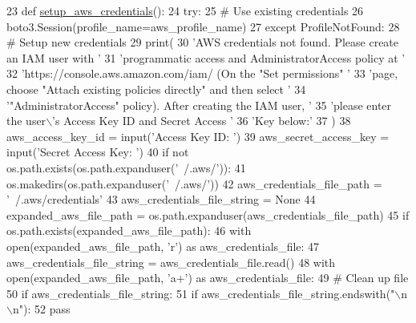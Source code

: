 \begin{DoxyCode}
23 \textcolor{keyword}{def }\hyperlink{namespaceparlai_1_1mturk_1_1core_1_1mturk__utils_a018a49fdf2cf6ff4c0b279d2f5b1bff0}{setup\_aws\_credentials}():
24     \textcolor{keywordflow}{try}:
25         \textcolor{comment}{# Use existing credentials}
26         boto3.Session(profile\_name=aws\_profile\_name)
27     \textcolor{keywordflow}{except} ProfileNotFound:
28         \textcolor{comment}{# Setup new credentials}
29         print(
30             \textcolor{stringliteral}{'AWS credentials not found. Please create an IAM user with '}
31             \textcolor{stringliteral}{'programmatic access and AdministratorAccess policy at '}
32             \textcolor{stringliteral}{'https://console.aws.amazon.com/iam/ (On the "Set permissions" '}
33             \textcolor{stringliteral}{'page, choose "Attach existing policies directly" and then select '}
34             \textcolor{stringliteral}{'"AdministratorAccess" policy). After creating the IAM user, '}
35             \textcolor{stringliteral}{'please enter the user\(\backslash\)'s Access Key ID and Secret Access '}
36             \textcolor{stringliteral}{'Key below:'}
37         )
38         aws\_access\_key\_id = input(\textcolor{stringliteral}{'Access Key ID: '})
39         aws\_secret\_access\_key = input(\textcolor{stringliteral}{'Secret Access Key: '})
40         \textcolor{keywordflow}{if} \textcolor{keywordflow}{not} os.path.exists(os.path.expanduser(\textcolor{stringliteral}{'~/.aws/'})):
41             os.makedirs(os.path.expanduser(\textcolor{stringliteral}{'~/.aws/'}))
42         aws\_credentials\_file\_path = \textcolor{stringliteral}{'~/.aws/credentials'}
43         aws\_credentials\_file\_string = \textcolor{keywordtype}{None}
44         expanded\_aws\_file\_path = os.path.expanduser(aws\_credentials\_file\_path)
45         \textcolor{keywordflow}{if} os.path.exists(expanded\_aws\_file\_path):
46             with open(expanded\_aws\_file\_path, \textcolor{stringliteral}{'r') as aws\_credentials\_file:}
47 \textcolor{stringliteral}{                aws\_credentials\_file\_string = aws\_credentials\_file.read()}
48 \textcolor{stringliteral}{        with open(expanded\_aws\_file\_path, 'a+'}) \textcolor{keyword}{as} aws\_credentials\_file:
49             \textcolor{comment}{# Clean up file}
50             \textcolor{keywordflow}{if} aws\_credentials\_file\_string:
51                 \textcolor{keywordflow}{if} aws\_credentials\_file\_string.endswith(\textcolor{stringliteral}{"\(\backslash\)n\(\backslash\)n"}):
52                     \textcolor{keywordflow}{pass}

\end{DoxyCode}
